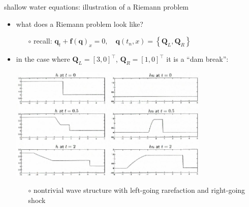 \documentclass[10pt,hyperref,dvipsnames]{beamer}
\newcommand{\bbf}{\mathbf{f}}
\newcommand{\bq}{\mathbf{q}}
\newcommand{\bQ}{\mathbf{Q}}
\begin{document}
\begin{frame}{shallow water equations: illustration of a Riemann problem}

\begin{itemize}
\item what does a Riemann problem look like?
    \begin{itemize}
    \item[$\circ$] recall: \quad $\bq_t + \bbf(\bq)_x = 0, \quad \bq(t_n,x) = \left\{\bQ_L, \bQ_R\right\}$
    \end{itemize}
\item in the case where $\bQ_L = [3,0]^\top$, $\bQ_R = [1,0]^\top$ it is a ``dam break'':

\begin{center}
\includegraphics[width=0.75\textwidth]{figs/leveque13p4}
\end{center}

    \begin{itemize}
    \item[$\circ$] nontrivial wave structure with left-going rarefaction and right-going shock
    \end{itemize}
\end{itemize}
\end{frame}
\end{document}
